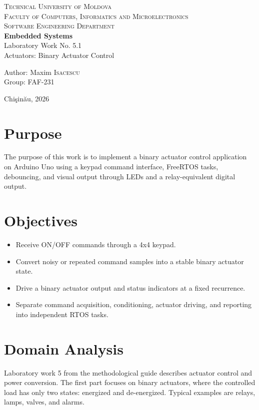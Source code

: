 \documentclass[12pt]{article}
\begin{document}
\begin{titlepage}
\begin{center}
\textsc{\large Technical University of Moldova}\\[0.4cm]
\textsc{\large Faculty of Computers, Informatics and Microelectronics}\\[0.4cm]
\textsc{\large Software Engineering Department}\\[2.0cm]
{\LARGE \textbf{Embedded Systems}}\\[0.5cm]
{\large Laboratory Work No. 5.1}\\[0.3cm]
{\large Actuators: Binary Actuator Control}\\[7cm]
\begin{flushright}
Author: Maxim \textsc{Isacescu}\\
Group: FAF-231
\end{flushright}
\vfill
Chi\c{s}in\u{a}u, 2026
\end{center}
\end{titlepage}

\tableofcontents
\clearpage

\section{Purpose}
The purpose of this work is to implement a binary actuator control application on Arduino Uno using a keypad command interface, FreeRTOS tasks, debouncing, and visual output through LEDs and a relay-equivalent digital output.

\section{Objectives}
\begin{itemize}
  \item Receive ON/OFF commands through a 4x4 keypad.
  \item Convert noisy or repeated command samples into a stable binary actuator state.
  \item Drive a binary actuator output and status indicators at a fixed recurrence.
  \item Separate command acquisition, conditioning, actuator driving, and reporting into independent RTOS tasks.
\end{itemize}

\section{Domain Analysis}
Laboratory work 5 from the methodological guide describes actuator control and power conversion. The first part focuses on binary actuators, where the controlled load has only two states: energized and de-energized. Typical examples are relays, lamps, valves, and alarms.
\end{document}
